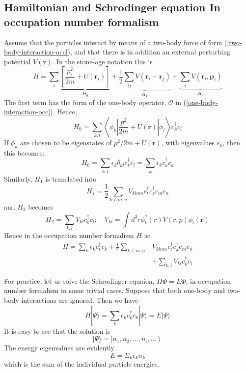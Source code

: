 \subsection{Hamiltonian and Schrodinger equation In occupation number formalism}
Assume that the particles interact by means of a two-body force of form (\ref{two-body-interaction-occ}), and that there is in addition an external perturbing potential $V(\mathbf{r})$. In the stone-age notation this is
\begin{equation}H=\sum_{i} \underbrace{\left[\frac{p_{i}^{2}}{2 m}+U\left(\mathbf{r}_{i}\right)\right]}_{H_{0}}+\underbrace{\frac{1}{2} \sum_{i j} V\left(\mathbf{r}_{i}-\mathbf{r}_{j}\right)}_{H_{1}}+\underbrace{\sum_{i} V\left(\mathbf{r}_{i}, \mathbf{p}_{i}\right)}_{H_{2}}\end{equation}
The first term has the form of the one-body operator, $\mathcal{O}$ in (\ref{one-body-interaction-occ}). Hence,
\begin{equation}H_{0}=\sum_{k, l}\left\langle\phi_{k}\left|\frac{p^{2}}{2 m}+U(\mathbf{r})\right| \phi_{l}\right\rangle c_{k}^{\dagger} c_{l}\end{equation}
If $\phi_k$ are chosen to be eigenstates of $p^2/2m+U(\mathbf{r})$, with eigenvalues $\epsilon_k$, then this becomes:
\begin{equation}H_{0}=\sum_{k, l} \epsilon_{k} \delta_{k l} c_{k}^{\dagger} c_{l}=\sum_{k} \epsilon_{k} c_{k}^{\dagger} c_{k}\end{equation}
Similarly, $H_1$ is translated into
\begin{equation}H_{1}=\frac{1}{2} \sum_{k, l, m, n} V_{k l m n} c_{l}^{\dagger} c_{k}^{\dagger} c_{m} c_{n}\end{equation}
and $H_2$ becomes 
\begin{equation}H_{2}=\sum_{k, l} V_{k l} c_{k}^{\dagger} c_{l} ; \quad V_{k l}=\int d^{3} r \phi_{k}^{*}(r) V(r, p) \phi_{l}(\mathbf{r})\end{equation}
Hence in the occupation number formalism $H$ is:
\begin{equation}\begin{array}{rl}
H=\sum_{k} \epsilon_{k} c_{k}^{\dagger} c_{k}+\frac{1}{2} \sum_{k, l, m, n} & V_{k l m n} c_{l}^{\dagger} c_{k}^{\dagger} c_{m} c_{n} \\
& +\sum_{k, l} V_{k l} c_{k}^{\dagger} c_{l}
\end{array}\end{equation}

For practice, let us solve the Schrodinger equaion, $H\Phi=E\Phi$, in occupation number formalism in some trivial cases. Suppose that both one-body and two-body interactions are ignored. Then we have
\begin{equation}H|\Psi\rangle=\sum_{k} \epsilon_{k} c_{k}^{\dagger} c_{k}|\Psi\rangle=E|\Psi\rangle\end{equation}
It is easy to see that the solution is
$$|\Psi\rangle=\left|n_{1}, n_{2}, \ldots, n_{i}, \ldots\right\rangle$$
The energy eigenvalues are evidently
$$
E=\Sigma_k\epsilon_kn_k
$$
which is the sum of the individual particle energies.

